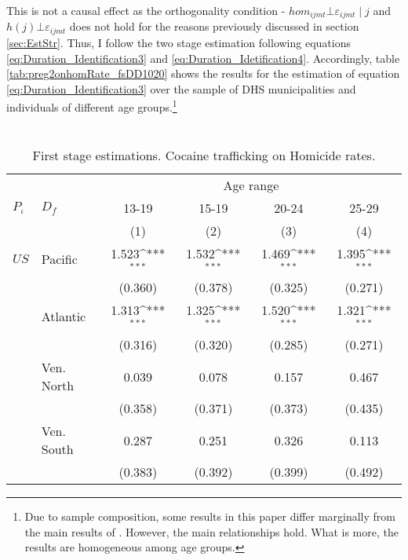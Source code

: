 \documentclass[a4paper,10pt,twocolumn,preprint,3p,authoryear]{elsarticle}
\def\sym#1{\ifmmode^{#1}\else\(^{#1}\)\fi}
\begin{document}
This is not a causal effect as the orthogonality condition - $hom_{ijmt}\bot\varepsilon_{ijmt}\mid j$ and $h\left(j\right)\bot\varepsilon_{ijmt}$ does not hold for the reasons previously discussed in section \ref{sec:EstStr}. Thus, I follow the two stage estimation following equations \ref{eq:Duration_Identification3} and \ref{eq:Duration_Idetification4}. Accordingly, table \ref{tab:preg2onhomRate_fsDD1020} shows the results for the estimation of equation \ref{eq:Duration_Identification3} over the sample of DHS municipalities and individuals of different age groups.\footnote{Due to sample composition, some results in this paper differ marginally from the main results of \citet{Millan2014Trafficking}.  However, the main relationships hold. What is more, the results are homogeneous among age groups.}

\begin{table}[h]
	\caption{\\ First stage estimations. Cocaine trafficking on Homicide rates.}	
	\footnotesize
	\begin{tabular}{llcccc}
		\hline
		&	& \multicolumn{4}{c}{{Age range}} \\  
		$P_{\iota}$&	$D_{f}$&	13-19&	15-19& 20-24& 25-29 \\ 
			& & (1)& (2)& (3)& (4) \\ \hline
		$US$& Pacific	&       1.523\sym{***}&	       1.532\sym{***}&	       1.469\sym{***}&	       1.395\sym{***}\\
&	&     (0.360)         &	     (0.378)         &	     (0.325)         &	     (0.271)         \\
				
& Atlantic	&       1.313\sym{***}&	       1.325\sym{***}&	       1.520\sym{***}&	       1.321\sym{***}\\
&	&     (0.316)         &	     (0.320)         &	     (0.285)         &	     (0.271)         \\
				
& Ven. North&       0.039         &	       0.078         &	       0.157         &	       0.467         \\
&	&     (0.358)         &	     (0.371)         &	     (0.373)         &	     (0.435)         \\
				
& Ven. South&	       0.287         &	       0.251         &	       0.326         &	       0.113         \\
&	&     (0.383)         &	     (0.392)         &	     (0.399)         &	     (0.492)         \\
				

\end{tabular}
\end{table}
\end{document}

